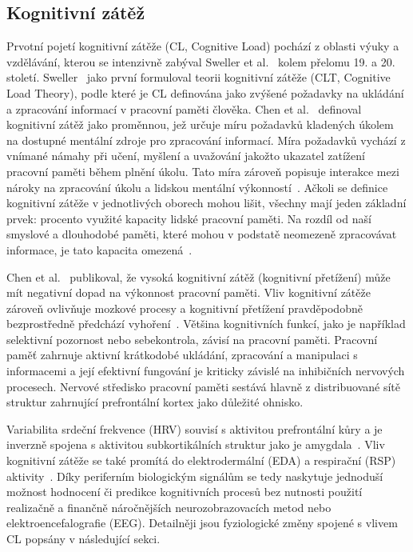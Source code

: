 \subsection{Kognitivní zátěž}
\label{subsection:kognitivni_zatez}
Prvotní pojetí kognitivní zátěže (\gls{CL}, Cognitive Load) pochází z oblasti
výuky a vzdělávání, kterou se intenzivně zabýval Sweller et
al.~\cite{Sweller1988,Sweller1998,Sweller2010} kolem přelomu 19. a 20. století.
Sweller~\cite{Sweller1988} jako první formuloval teorii kognitivní zátěže
(\gls{CLT}, Cognitive Load Theory), podle které je \gls{CL} definována jako
zvýšené požadavky na ukládání a zpracování informací v pracovní paměti člověka.
Chen et al.~\cite{Chen2016} definoval kognitivní zátěž jako proměnnou, jež
určuje míru požadavků kladených úkolem na dostupné mentální zdroje pro
zpracování informací. Míra požadavků vychází z vnímané námahy při učení, myšlení
a uvažování jakožto ukazatel zatížení pracovní paměti během plnění úkolu. Tato
míra zároveň popisuje interakce mezi nároky na zpracování úkolu a lidskou
mentální výkonností~\cite{Haapalainen2010}. Ačkoli se definice kognitivní zátěže
v jednotlivých oborech mohou lišit, všechny mají jeden základní prvek: procento
využité kapacity lidské pracovní paměti. Na rozdíl od naší smyslové a dlouhodobé
paměti, které mohou v podstatě neomezeně zpracovávat informace, je tato kapacita
omezená~\cite{Vanneste2021}.

Chen et al.~\cite{Chen2016} publikoval, že vysoká kognitivní zátěž (kognitivní
přetížení) může mít negativní dopad na výkonnost pracovní paměti. Vliv
kognitivní zátěže zároveň ovlivňuje mozkové procesy a kognitivní přetížení
pravděpodobně bezprostředně předchází vyhoření~\cite{Vanneste2021}. Většina
kognitivních funkcí, jako je například selektivní pozornost nebo sebekontrola,
závisí na pracovní paměti. Pracovní paměť zahrnuje aktivní krátkodobé ukládání,
zpracování a manipulaci s informacemi a její efektivní fungování je kriticky
závislé na inhibičních nervových procesech. Nervové středisko pracovní paměti
sestává hlavně z distribuované sítě struktur zahrnující prefrontální kortex jako
důležité ohnisko. 

Variabilita srdeční frekvence (\gls{HRV}) souvisí s aktivitou prefrontální kůry
a je inverzně spojena s aktivitou subkortikálních struktur jako je
amygdala~\cite{Thayer2009}. Vliv kognitivní zátěže se také promítá do
elektrodermální (\gls{EDA}) a respirační (\gls{RSP})
aktivity~\cite{Mogilever2018}. Díky periferním biologickým signálům se tedy
naskytuje jednoduší možnost hodnocení či predikce kognitivních procesů bez
nutnosti použití realizačně a finančně náročnějších neurozobrazovacích metod
nebo elektroencefalografie (\gls{EEG}). Detailněji jsou fyziologické změny
spojené s vlivem \gls{CL} popsány v následující sekci.

